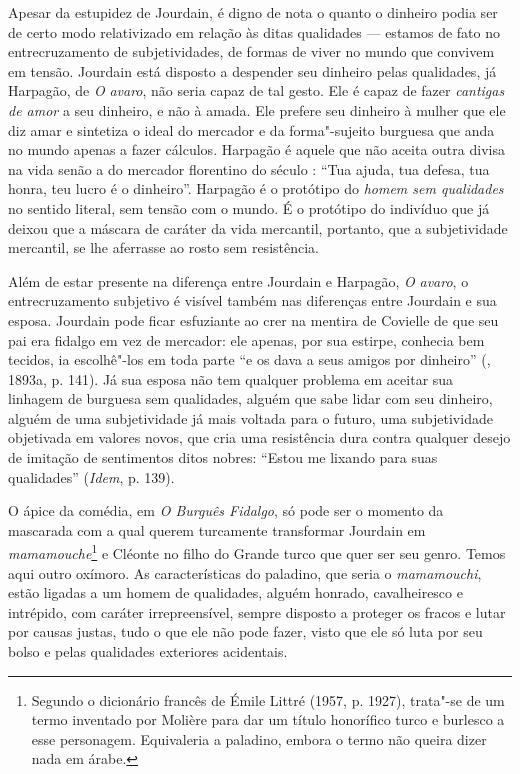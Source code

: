 Apesar da estupidez de Jourdain, é digno de nota o quanto o dinheiro
podia ser de certo modo relativizado em relação às ditas qualidades ---
estamos de fato no entrecruzamento de subjetividades, de formas de viver
no mundo que convivem em tensão. Jourdain está disposto a despender seu
dinheiro pelas qualidades, já Harpagão, de \emph{O} \emph{avaro}, não
seria capaz de tal gesto. Ele é capaz de fazer \emph{cantigas de amor} a
seu dinheiro, e não à amada. Ele prefere seu dinheiro à mulher que ele
diz amar e sintetiza o ideal do mercador e da forma"-sujeito burguesa que
anda no mundo apenas a fazer cálculos. Harpagão é aquele que não aceita
outra divisa na vida senão a do mercador florentino do século : ``Tua
ajuda, tua defesa, tua honra, teu lucro é o dinheiro''. Harpagão é o
protótipo do \emph{homem sem qualidades} no sentido literal, sem tensão
com o mundo. É o protótipo do indivíduo que já deixou que a máscara de
caráter da vida mercantil, portanto, que a subjetividade mercantil, se
lhe aferrasse ao rosto sem resistência.

Além de estar presente na diferença entre Jourdain e Harpagão, \emph{O} \emph{avaro}, o
entrecruzamento subjetivo é visível também nas diferenças entre Jourdain
e sua esposa. Jourdain pode ficar esfuziante ao crer na mentira de
Covielle de que seu pai era fidalgo em vez de mercador: ele apenas, por
sua estirpe, conhecia bem tecidos, ia escolhê"-los em toda parte ``e os
dava a seus amigos por dinheiro'' (, 1893a, p. 141). Já sua
esposa não tem qualquer problema em aceitar sua linhagem de burguesa sem
qualidades, alguém que sabe lidar com seu dinheiro, alguém de uma
subjetividade já mais voltada para o futuro, uma subjetividade
objetivada em valores novos, que cria uma resistência dura contra
qualquer desejo de imitação de sentimentos ditos nobres: ``Estou me
lixando para suas qualidades'' (\emph{Idem}, p. 139).

O ápice da comédia, em \emph{O Burguês Fidalgo}, só pode ser o momento
da mascarada com a qual querem turcamente transformar Jourdain em
\emph{mamamouche}\footnote{Segundo o dicionário francês de Émile Littré
  (1957, p. 1927), trata"-se de um termo inventado por Molière para dar
  um título honorífico turco e burlesco a esse personagem. Equivaleria a
  paladino, embora o termo não queira dizer nada em árabe.} e Cléonte no
filho do Grande turco que quer ser seu genro. Temos aqui outro oxímoro.
As características do paladino, que seria o \emph{mamamouchi}, estão
ligadas a um homem de qualidades, alguém honrado, cavalheiresco e
intrépido, com caráter irrepreensível, sempre disposto a proteger os
fracos e lutar por causas justas, tudo o que ele não pode fazer, visto
que ele só luta por seu bolso e pelas qualidades exteriores acidentais.

